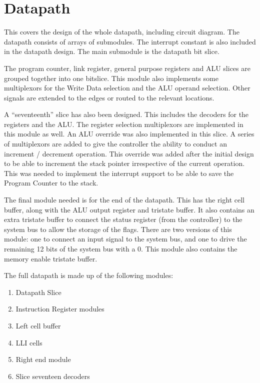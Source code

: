 

\section{Datapath}

This covers the design of the whole datapath, including circuit diagram.
The datapath consists of arrays of submodules. 
The interrupt constant is also included in the datapath design.
The main submodule is the datapath bit slice. 

The program counter, link register, general purpose registers and ALU slices are grouped together into one bitslice.
This module also implements some multiplexors for the Write Data selection and the ALU operand selection.
Other signals are extended to the edges or routed to the relevant locations. 

A ``seventeenth'' slice has also been designed. 
This includes the decoders for the registers and the ALU.
The register selection multiplexors are implemented in this module as well.
An ALU override was also implemented in this slice.
A series of multiplexors are added to give the controller the ability to conduct an increment / decrement operation. 
This override was added after the initial design to be able to increment the stack pointer irrespective of the current operation.
This was needed to implement the interrupt support to be able to save the Program Counter to the stack.

The final module needed is for the end of the datapath. 
This has the right cell buffer, along with the ALU output register and tristate buffer.
It also contains an extra tristate buffer to connect the status register (from the controller) to the system bus to allow the storage of the flags.
There are two versions of this module: one to connect an input signal to the system bus, and one to drive the remaining 12 bits of the system bus with a 0. 
This module also contains the memory enable tristate buffer.


The full datapath is made up of the following modules:
\begin{enumerate}
\item Datapath Slice
\item Instruction Register modules
\item Left cell buffer
\item LLI cells
\item Right end module
\item Slice seventeen decoders
\end{enumerate}

